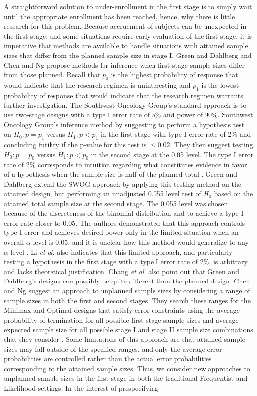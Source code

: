 \documentclass[12pt]{report}\usepackage[]{graphicx}\usepackage[]{color}
\newlength{\li}\setlength{\li}{14.48pt}
\newlength{\di}\setlength{\di}{-3.5mm}
\begin{document}
\indent A straightforward solution to under-enrollment in the first stage is to simply wait until the appropriate enrollment has been reached, hence, why there is little research for this problem. Because accruement of subjects can be unexpected in the first stage, and some situations require early evaluation of the first stage, it is imperative that methods are available to handle situations with attained sample sizes that differ from the planned sample size in stage I. Green and Dahlberg \cite{Green} and Chen and Ng \cite{Chen} propose methods for inference when first stage sample sizes differ from those planned. Recall that $p_0$ is the highest probability of response that would indicate that the research regimen is uninteresting and $p_1$ is the lowest probability of response that would indicate that the research regimen warrants further investigation. The Southwest Oncology Group's standard approach is to use two-stage designs with a type I error rate of 5\% and power of 90\%. Southwest Oncology Group's inference method by suggesting to perform a hypothesis test on $H_0: p=p_1$ versus $H_1: p < p_1$ in the first stage with type I error rate of 2\% and concluding futility if the p-value for this test is $\leq 0.02$. They then suggest testing $H_0: p=p_0$ versus $H_1: p < p_0$ in the second stage at the 0.05 level. The type I error rate of 2\% corresponds to intuition regarding what constitutes evidence in favor of a hypothesis when the sample size is half of the planned total \cite{Green}. Green and Dahlberg extend the SWOG approach by applying this testing method on the attained design, but performing an unadjusted 0.055 level test of $H_0$ based on the attained total sample size at the second stage. The 0.055 level was chosen because of the discreteness of the binomial distribution and to achieve a type I error rate closer to 0.05. The authors demonstrated that this approach controls type I error and achieves desired power only in the limited situation when an overall $\alpha$-level is 0.05, and it is unclear how this method would generalize to any $\alpha$-level \cite{Li}. Li \textit{et al.} also indicates that this limited approach, and particularly testing a hypothesis in the first stage with a type I error rate of 2\%, is arbitrary and lacks theoretical justification. Chang \textit{et al}. \cite{Chang} also point out that Green and Dahlberg's designs can possibly be quite different than the planned design. Chen and Ng \cite{Chen} suggest an approach to unplanned sample sizes by considering a range of sample sizes in both the first and second stages. They search these ranges for the Minimax and Optimal designs that satisfy error constraints using the average probability of termination for all possible first stage sample sizes and average expected sample size for all possible stage I and stage II sample size combinations that they consider \cite{Chen}. Some limitations of this approach are that attained sample sizes may fall outside of the specified ranges, and only the average error probabilities are controlled rather than the actual error probabilities corresponding to the attained sample sizes. Thus, we consider new approaches to unplanned sample sizes in the first stage in both the traditional Frequentist and Likelihood settings. In the interest of prespecifying 
\end{document}
